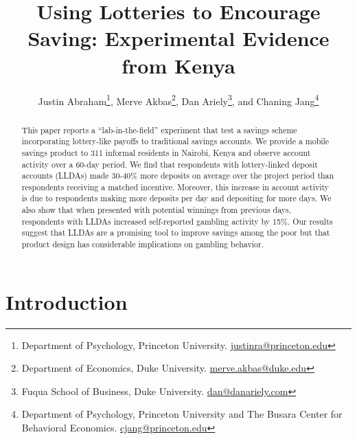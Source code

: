 \documentclass[10pt]{article}
\begin{document}
\onehalfspacing

\title{Using Lotteries to Encourage Saving: Experimental Evidence from Kenya}

\author{Justin Abraham\thanks{Department of Psychology, Princeton University. \protect\href{mailto:justinra@princeton.edu}{justinra@princeton.edu}}, Merve Akbas\thanks{Department of Economics, Duke University. \protect\href{mailto:merve.akbas@duke.edu}{merve.akbas@duke.edu}}, Dan Ariely\thanks{Fuqua School of Business, Duke University. \protect\href{mailto:dan@danariely.com}{dan@danariely.com}}, and Chaning Jang\thanks{Department of Psychology, Princeton University and The Busara Center for Behavioral Economics. \protect\href{mailto:cjang@princeton.edu}{cjang@princeton.edu}}}

\maketitle

\begin{abstract}
This paper reports a ``lab-in-the-field'' experiment that test a savings scheme incorporating lottery-like payoffs to traditional savings accounts. We provide a mobile savings product to 311 informal residents in Nairobi, Kenya and observe account activity over a 60-day period. We find that respondents with lottery-linked deposit accounts (LLDAs) made 30-40\% more deposits on average over the project period than respondents receiving a matched incentive. Moreover, this increase in account activity is due to respondents making more deposits per day and depositing for more days. We also show that when presented with potential winnings from previous days, respondents with LLDAs increased self-reported gambling activity by 15\%. Our results suggest that LLDAs are a promising tool to improve savings among the poor but that product design has considerable implications on gambling behavior.
\end{abstract}

\newpage

\section{Introduction}
\end{document}
